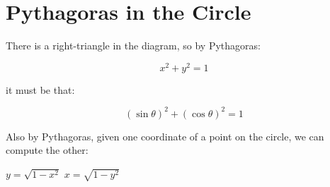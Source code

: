 \section{Pythagoras in the Circle}

There is a right-triangle in the diagram, so by Pythagoras:

$$
x^2 + y^2 = 1
$$

it must be that:

$$
(\sin \theta)^2 + (\cos \theta)^2 = 1
$$

Also by Pythagoras, given one coordinate of a point on the circle, we can compute the other:

\begin{center}
    $y = \sqrt{1 - x^2}$ \quad $x = \sqrt{1 - y^2}$    
\end{center}

